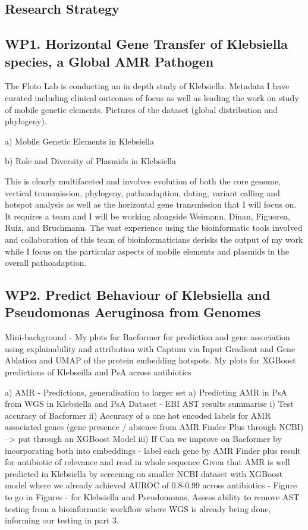 \subsection*{Research Strategy}


\subsection*{WP1. Horizontal Gene Transfer of Klebsiella species, a Global AMR Pathogen}
The Floto Lab is conducting an in depth study of Klebsiella. Metadata I have curated including clinical outcomes of focus as well as leading the work on study of mobile genetic elements. Pictures of the dataset (global distribution and phylogeny). 

a)  Mobile Genetic Elements in Klebsiella 

b)  Role and Diversity of Plasmids in Klebsiella

This is clearly multifaceted and involves evolution of both the core genome, vertical transmission, phylogeny, pathoadaption, dating, variant calling and hotspot analysis as well as the horizontal gene transmission that I will focus on.  It requires a team and I will be working alongside Weimann, Dinan, Figuorea, Ruiz, and Bruchmann. The vast experience using the bioinformatic tools involved and collaboration of this team of bioinformaticians derisks the output of my work while I focus on the particular aspects of mobile elements and plasmids in the overall pathoadaption. 

\subsection*{WP2. Predict Behaviour of Klebsiella and Pseudomonas Aeruginosa from Genomes}
Mini-background - My plots for Bacformer for prediction and gene association using explainability and attribution with Captum via Input Gradient and Gene Ablation and UMAP of  the protein embedding hotspots. 
My plots for XGBoost predictions of Klebseilla and PsA across antibiotics

a)  AMR - Predictions, generalisation to larger set 
a)  Predicting AMR in PsA from WGS in Klebsiella and PsA
Dataset - EBI AST results summarise
i)   Test accuracy of Bacformer 
ii)  Accuracy of a one hot encoded labels for AMR associated genes (gene presence / absence from AMR Finder Plus through NCBI) -->  put through an XGBoost Model
iii)  If Can we improve on Bacformer by incorporating both into embeddings - label each gene by AMR Finder plus result for antibiotic of relevance and read in whole sequence
Given that AMR is well predicted in Klebsiella by screening on smaller NCBI dataset with XGBoost model where we already achieved AUROC of 0.8-0.99 across antibiotics - Figure to go in Figures - for Klebsiella and Pseudomonas, 
Assess ability to remove AST testing from a bioinformatic workflow where WGS is already being done, informing our testing in part 3. 

